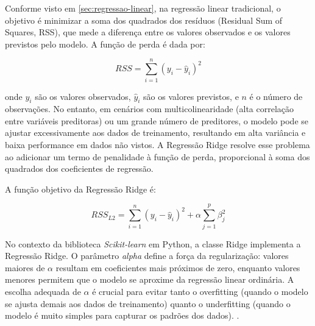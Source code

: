 Conforme visto em \ref{sec:regressao-linear}, na regressão linear tradicional, o objetivo é minimizar a soma dos quadrados dos resíduos (Residual Sum of Squares, RSS), que mede a diferença entre os valores observados e os valores previstos pelo modelo. A função de perda é dada por:

\begin{equation}
	RSS = \sum_{i=1}^{n} (y_i - \hat{y}_i)^2
\end{equation}

onde $y_i$ são os valores observados, $\hat{y}_i$ são os valores previstos, e $n$ é o número de observações. No entanto, em cenários com multicolinearidade (alta correlação entre variáveis preditoras) ou um grande número de preditores, o modelo pode se ajustar excessivamente aos dados de treinamento, resultando em alta variância e baixa performance em dados não vistos. A Regressão Ridge resolve esse problema ao adicionar um termo de penalidade à função de perda, proporcional à soma dos quadrados dos coeficientes de regressão. 

A função objetivo da Regressão Ridge é:

\begin{equation}
	RSS_{L2} = \sum_{i=1}^{n} (y_i - \hat{y}_i)^2 + \alpha \sum_{j=1}^{p} \beta_j^2
\end{equation}

No contexto da biblioteca \textit{Scikit-learn} em Python, a classe Ridge implementa a Regressão Ridge. O parâmetro \textit{alpha} define a força da regularização: valores maiores de $\alpha$ resultam em coeficientes mais próximos de zero, enquanto valores menores permitem que o modelo se aproxime da regressão linear ordinária. A escolha adequada de 
$\alpha$ é crucial para evitar tanto o overfitting  (quando o modelo se ajusta demais aos dados de treinamento) quanto o underfitting (quando o modelo é muito simples para capturar os padrões dos dados). \cite{ScikitLearnRidge2025}.




